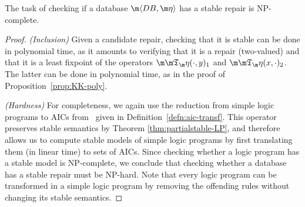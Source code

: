 \begin{proposition}\label{prop:stable-complexity}
  The task of checking if a database $\fulldb$ has a stable repair is NP-complete.
\end{proposition}
\begin{proof}
  \emph{(Inclusion)} Given a candidate repair, checking that it is stable can be done in polynomial time, as it amounts to verifying that it is a repair (two-valued) and that it is a least fixpoint of the operators $\Ap(\cdot,y)_1$ and $\Ap(x,\cdot)_2$.
  The latter can be done in polynomial time, as in the proof of Proposition~\ref{prop:KK-poly}.

  \emph{(Hardness)} For completeness, we again use the reduction from simple logic programs to AICs from~\cite{tplp/CaropreseT11} given in Definition~\ref{defn:aic-transf}.
  This operator preserves stable semantics by Theorem \ref{thm:partialstable-LP}, and therefore allows us to compute stable models of simple logic programs by first translating them (in linear time) to sets of AICs.
  Since checking whether a logic program has a stable model is NP-complete, we conclude that checking whether a database has a stable repair must be NP-hard.
  Note that every logic program can be transformed in a simple logic program by removing the offending rules without changing its stable semantics.
\end{proof}

